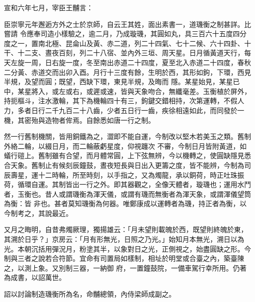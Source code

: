 \begin{pinyinscope}
 宣和六年七月，宰臣王黼言：



 臣崇寧元年邂逅方外之士於京師，自云王其姓，面出素書一，道璣衡之制甚詳。比嘗請
 令應奉司造小樣驗之，逾二月，乃成璇璣，其圓如丸，具三百六十五度四分度之一，置南北極、昆侖山及黃、赤二道，列二十四氣、七十二候、六十四卦、十干、十二支、晝夜百刻，列二十八宿、並內外三垣、周天星。日月循黃道天行，每天左旋一周，日右旋一度，冬至南出赤道二十四度，夏至北入赤道二十四度，春秋二分黃、赤道交而出卯入酉。月行十三度有餘，生明於西，其形如鉤，下環，西見半規，及望而圓；既望，西缺下環，東見半規，及晦而
 隱。某星始見，某星已中，某星將入，或左或右，或遲或速，皆與天象吻合，無纖毫差。玉衡植於屏外，持扼樞斗，注水激輪，其下為機輪四十有三，鉤鍵交錯相持，次第運轉，不假人力，多者日行二千九百二十八齒，少者五日行一齒，疾徐相遠如此，而同發於一機，其密殆與造物者侔焉。自餘悉如唐一行之制。



 然一行舊制機關，皆用銅鐵為之，澀即不能自運，今制改以堅木若美玉之類。舊制外絡二輪，以綴日月，而二輪蔽虧星度，仰視躔次
 不審，今制日月皆附黃道，如蟻行磑上。舊制雖有合望，而月體常圓，上下弦無辨，今以機轉之，使圓缺隱見悉合天象。舊制止有候刻辰鐘鼓，晝夜短長與日出入更籌之度，皆不能辨，今制為司辰壽星，運十二時輪，所至時刻，以手指之，又為燭龍，承以銅荷，時正吐珠振荷，循環自運。其制皆出一行之外。即其器觀之，全像天體者，璇璣也；運用水鬥者，玉衡也。昔人或謂璣衡為渾天儀，或謂有璣而無衡者為渾天象，或謂渾儀望筒為衡：皆
 非也。甚者莫知璣衡為何器。唯鄭康成以運轉者為璣，持正者為衡，以今制考之，其說最近。



 又月之晦明，自昔弗燭厥理，獨揚雄云：「月未望則載魄於西，既望則終魄於東，其溯於日乎？」京房云：「月有形無光，日照之乃光。」始知月本無光，溯日以為光。本朝沉括用彈況月，粉塗其半，以象對日之光，正側視之，始盡圓缺之形。今制與三者之說若合符節。宜命有司置局如樣制，相址於明堂或合臺之內，築臺陳之，以測上象。又別制三器，一納御
 府，一置鐘鼓院，一備車駕行幸所用。仍著為成書，以詔萬世。



 詔以討論制造璣衡所為名，命黼總領，內侍梁師成副之。



\end{pinyinscope}